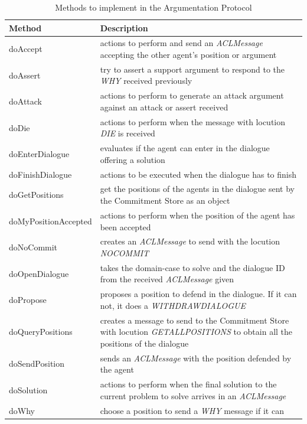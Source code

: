 \begin{table}[h!t]
\begin{tabulary}{1\linewidth}{|l|L|}
\hline
\textbf{Method} & \textbf{Description} \\ \hline
doAccept & actions to perform and send an \textit{ACLMessage} accepting the other agent's position or argument \\ \hline
doAssert & try to assert a support argument to respond to the \textit{WHY} received previously \\ \hline
doAttack & actions to perform to generate an attack argument against an attack or assert received \\ \hline
doDie & actions to perform when the message with locution \textit{DIE} is received \\ \hline
doEnterDialogue & evaluates if the agent can enter in the dialogue offering a solution \\ \hline
doFinishDialogue & actions to be executed when the dialogue has to finish \\ \hline
doGetPositions & get the positions of the agents in the dialogue sent by the Commitment Store as an object \\ \hline
doMyPositionAccepted & actions to perform when the position of the agent has been accepted \\ \hline
doNoCommit & creates an \textit{ACLMessage} to send with the locution \textit{NOCOMMIT} \\ \hline
doOpenDialogue & takes the domain-case to solve and the dialogue ID from the received \textit{ACLMessage} given \\ \hline
doPropose & proposes a position to defend in the dialogue. If it can not, it does a \textit{WITHDRAWDIALOGUE} \\ \hline
doQueryPositions & creates a message to send to the Commitment Store with locution \textit{GETALLPOSITIONS} to obtain all the positions of the dialogue \\ \hline
doSendPosition & sends an \textit{ACLMessage} with the position defended by the agent \\ \hline
doSolution & actions to perform when the final solution to the current problem to solve arrives in an \textit{ACLMessage} \\ \hline
doWhy & choose a position to send a \textit{WHY} message if it can \\ \hline

\end{tabulary}
\caption{Methods to implement in the Argumentation Protocol}
\label{tab:ArgProtocolMethods}
\end{table}

